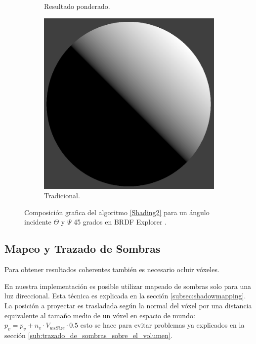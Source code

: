 \begin{figure}[H]
\begin{subfigure}[t]{0.2\textwidth}
		\caption*{Resultado ponderado.}
	\end{subfigure}%
	\begin{subfigure}[t]{0.2\textwidth}
		\centering
		\captionsetup{justification=centering}
		\includegraphics[width=\linewidth]{media/nDotLT.png}
		\caption*{Tradicional.}
	\end{subfigure}%
	\caption{Composición grafica del algoritmo \ref{Shading2} para un ángulo incidente $\Theta$ y $\Psi$ 45 grados en BRDF Explorer \cite{brdf_explorer}.}
	\label{fig:compositve_vshading}
\end{figure}


\subsection{Mapeo y Trazado de Sombras}

Para obtener resultados coherentes también es necesario ocluir vóxeles. 

En nuestra implementación es posible utilizar mapeado de sombras solo para una luz direccional. Esta técnica es explicada en la sección \ref{subsec:shadowmapping}. La posición a proyectar es trasladada según la normal del vóxel por una distancia equivalente al tamaño medio de un vóxel en espacio de mundo: $p_{v} = p_{v} + n_{v}\cdot V_{wsSize} \cdot 0.5$ esto se hace para evitar problemas ya explicados en la sección \ref{sub:trazado_de_sombras_sobre_el_volumen}.

